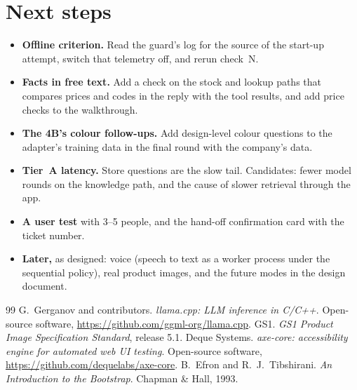 \documentclass[11pt,a4paper]{article}
\begin{document}
\section{Next steps}\label{sec:next}
\begin{itemize}
  \item \textbf{Offline criterion.} Read the guard's log for the source of the start-up attempt, switch that telemetry
        off, and rerun check~N.
  \item \textbf{Facts in free text.} Add a check on the stock and lookup paths that compares prices and codes in the
        reply with the tool results, and add price checks to the walkthrough.
  \item \textbf{The 4B's colour follow-ups.} Add design-level colour questions to the adapter's training data in the final
        round with the company's data.
  \item \textbf{Tier~A latency.} Store questions are the slow tail. Candidates: fewer model rounds on the knowledge path,
        and the cause of slower retrieval through the app.
  \item \textbf{A user test} with 3--5 people, and the hand-off confirmation card with the ticket number.
  \item \textbf{Later,} as designed: voice (speech to text as a worker process under the sequential policy), real product
        images, and the future modes in the design document.
\end{itemize}

\begin{thebibliography}{99}
 G.~Gerganov and contributors. \emph{llama.cpp: LLM inference in C/C++}. Open-source software,
  \url{https://github.com/ggml-org/llama.cpp}.
 GS1. \emph{GS1 Product Image Specification Standard}, release 5.1.
 Deque Systems. \emph{axe-core: accessibility engine for automated web UI testing}. Open-source software,
  \url{https://github.com/dequelabs/axe-core}.
 B.~Efron and R.~J.~Tibshirani. \emph{An Introduction to the Bootstrap}. Chapman \& Hall, 1993.
\end{thebibliography}

\appendix
\end{document}
